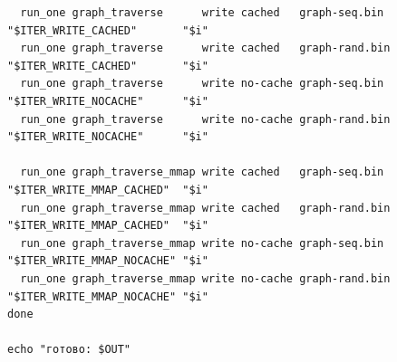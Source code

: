 \documentclass[12pt,a4paper]{article}
\begin{document}
\begin{verbatim}
  run_one graph_traverse      write cached   graph-seq.bin  "$ITER_WRITE_CACHED"       "$i"
  run_one graph_traverse      write cached   graph-rand.bin "$ITER_WRITE_CACHED"       "$i"
  run_one graph_traverse      write no-cache graph-seq.bin  "$ITER_WRITE_NOCACHE"      "$i"
  run_one graph_traverse      write no-cache graph-rand.bin "$ITER_WRITE_NOCACHE"      "$i"

  run_one graph_traverse_mmap write cached   graph-seq.bin  "$ITER_WRITE_MMAP_CACHED"  "$i"
  run_one graph_traverse_mmap write cached   graph-rand.bin "$ITER_WRITE_MMAP_CACHED"  "$i"
  run_one graph_traverse_mmap write no-cache graph-seq.bin  "$ITER_WRITE_MMAP_NOCACHE" "$i"
  run_one graph_traverse_mmap write no-cache graph-rand.bin "$ITER_WRITE_MMAP_NOCACHE" "$i"
done

echo "готово: $OUT"
\end{verbatim}
\end{document}
